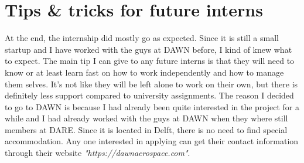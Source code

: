 \chapter{Tips \& tricks for future interns}

At the end, the internship did mostly go as expected. Since it is still a small startup and I have worked with the guys at DAWN before, I kind of knew what to expect. The main tip I can give to any future interns is that they will need to know or at least learn fast on how to work independently and how to manage them selves. It's not like they will be left alone to work on their own, but there is definitely less support compared to university assignments. 
The reason I decided to go to DAWN is because I had already been quite interested in the project for a while and I had already worked with the guys at DAWN when they where still members at DARE. Since it is located in Delft, there is no need to find special accommodation. Any one interested in applying can get their contact information through their website \textit{"https://dawnaerospace.com"}.
